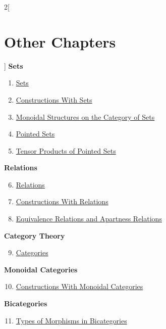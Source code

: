 \begin{multicols}{2}[\section{Other Chapters}]
\noindent
\textbf{Sets}
\begin{enumerate}
\item \hyperref[sets:section-phantom]{Sets}
\item \hyperref[constructions-with-sets:section-phantom]{Constructions With Sets}
\item \hyperref[monoidal-structures-on-the-category-of-sets:section-phantom]{Monoidal Structures on the Category of Sets}
\item \hyperref[pointed-sets:section-phantom]{Pointed Sets}
\item \hyperref[tensor-products-of-pointed-sets:section-phantom]{Tensor Products of Pointed Sets}
\end{enumerate}
\textbf{Relations}
\begin{enumerate}
\setcounter{enumi}{5}
\item \hyperref[relations:section-phantom]{Relations}
\item \hyperref[constructions-with-relations:section-phantom]{Constructions With Relations}
\item \hyperref[equivalence-relations-and-apartness-relations:section-phantom]{Equivalence Relations and Apartness Relations}
\end{enumerate}
\textbf{Category Theory}
\begin{enumerate}
\setcounter{enumi}{8}
\item \hyperref[categories:section-phantom]{Categories}
\end{enumerate}
\textbf{Monoidal Categories}
\begin{enumerate}
\setcounter{enumi}{9}
\item \hyperref[constructions-with-monoidal-categories:section-phantom]{Constructions With Monoidal Categories}
\end{enumerate}
\textbf{Bicategories}
\begin{enumerate}
\setcounter{enumi}{10}
\item \hyperref[types-of-morphisms-in-bicategories:section-phantom]{Types of Morphisms in Bicategories}
\end{enumerate}
\end{multicols}
